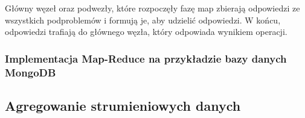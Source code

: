 Główny węzeł oraz podwezły, które rozpoczęły fazę map zbierają odpowiedzi ze wszystkich podproblemów i formują je, aby udzielić odpowiedzi. W końcu, odpowiedzi trafiają do głównego węzła, który odpowiada wynikiem operacji.

\subsubsection{Implementacja Map-Reduce na przykładzie bazy danych MongoDB}



\subsection{Agregowanie strumieniowych danych}


